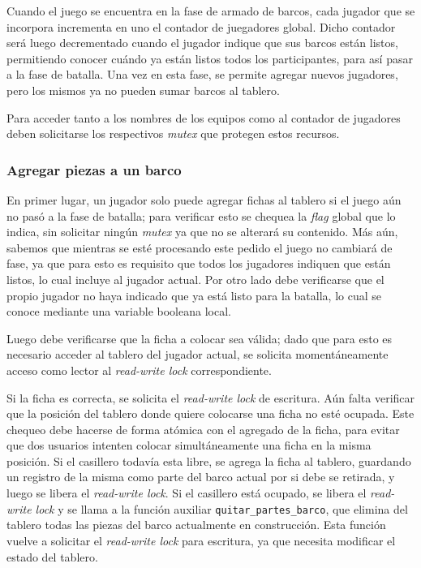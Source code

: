 \documentclass[a4paper]{article}
\begin{document}
Cuando el juego se encuentra en la fase de armado de barcos, cada jugador
que se incorpora incrementa en uno el contador de juegadores global. Dicho
contador será luego decrementado cuando el jugador indique que sus barcos
están listos, permitiendo conocer cuándo ya están listos todos los
participantes, para así pasar a la fase de batalla. Una vez en esta fase, se
permite agregar nuevos jugadores, pero los mismos ya no pueden sumar barcos
al tablero.

Para acceder tanto a los nombres de los equipos como al contador de jugadores
deben solicitarse los respectivos \emph{mutex} que protegen estos recursos.


\subsubsection*{Agregar piezas a un barco}

En primer lugar, un jugador solo puede agregar fichas al tablero si el juego
aún no pasó a la fase de batalla; para verificar esto se chequea la
\emph{flag} global que lo indica, sin solicitar ningún \emph{mutex} ya que no
se alterará su contenido. Más aún, sabemos que mientras se esté procesando
este pedido el juego no cambiará de fase, ya que para esto es requisito que
todos los jugadores indiquen que están listos, lo cual incluye al jugador
actual. Por otro lado debe verificarse que el propio jugador no haya indicado
que ya está listo para la batalla, lo cual se conoce mediante una variable
booleana local.

Luego debe verificarse que la ficha a colocar sea válida; dado que para esto
es necesario acceder al tablero del jugador actual, se solicita
momentáneamente acceso como lector al \emph{read-write lock} correspondiente.

Si la ficha es correcta, se solicita el \emph{read-write lock} de escritura.
Aún falta verificar que la posición del tablero donde quiere colocarse una
ficha no esté ocupada. Este chequeo debe hacerse de forma atómica con el
agregado de la ficha, para evitar que dos usuarios intenten colocar
simultáneamente una ficha en la misma posición. Si el casillero todavía esta
libre, se agrega la ficha al tablero, guardando un registro de la misma como
parte del barco actual por si debe se retirada, y luego se libera el
\emph{read-write lock}. Si el casillero está ocupado, se libera el
\emph{read-write lock} y se llama a la función auxiliar
\texttt{quitar\_partes\_barco}, que elimina del tablero todas las piezas del
barco actualmente en construcción. Esta función vuelve a solicitar el \emph
{read-write lock} para escritura, ya que necesita modificar el estado del
tablero.
\end{document}
